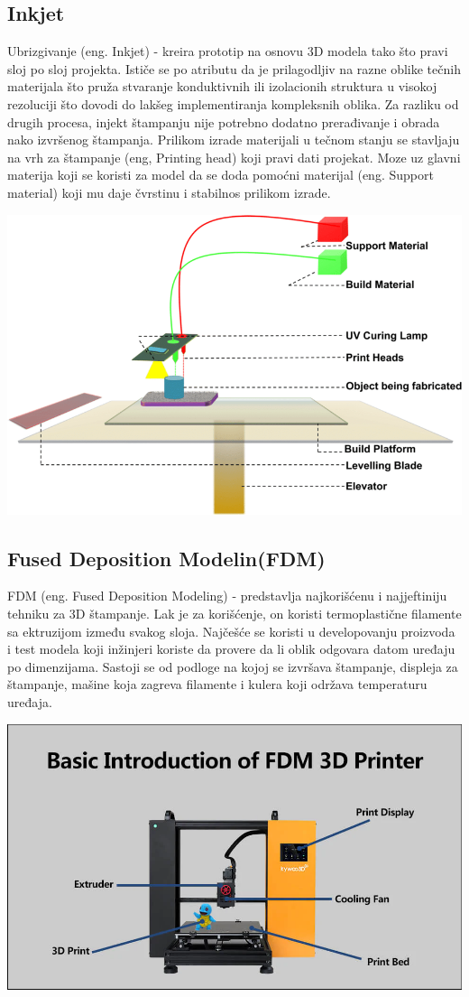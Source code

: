 \documentclass[a4paper]{article}
\begin{document}
{\subsection{Inkjet}
\label{subsec:podnaslov1}
Ubrizgivanje (eng. Inkjet) - kreira prototip na osnovu 3D modela tako što pravi sloj po sloj projekta.
\bigbreak Ističe se po atributu da je prilagodljiv na razne oblike tečnih materijala što pruža stvaranje konduktivnih ili izolacionih struktura u visokoj rezoluciji što dovodi do lakšeg implementiranja kompleksnih oblika. 
\bigbreak Za razliku od drugih procesa, injekt štampanju nije potrebno dodatno prerađivanje i obrada nako izvršenog štampanja.
\bigbreak Prilikom izrade materijali u tečnom stanju se stavljaju na vrh za štampanje (eng, Printing head) koji pravi dati projekat.
\bigbreak Moze uz glavni materija koji se koristi za model da se doda pomoćni materijal (eng. Support material) koji mu daje čvrstinu i stabilnos prilikom izrade.
\begin{center}
\includegraphics[width=.5\textwidth ]{Tehnikeslike/Inject.png}
\end{center}

\subsection{Fused Deposition Modelin(FDM)}
\label{subsec:podnaslov2}
FDM (eng. Fused Deposition Modeling) - predstavlja najkorišćenu i najjeftiniju tehniku za 3D štampanje. Lak je za korišćenje, on koristi termoplastične filamente sa ektruzijom između svakog sloja.
\bigbreak Najčešće se koristi u developovanju proizvoda  i test modela koji inžinjeri koriste da provere da li oblik odgovara datom uređaju po dimenzijama. 
\bigbreak Sastoji se od podloge na kojoj se izvršava štampanje, displeja za štampanje, mašine koja zagreva filamente i kulera koji održava temperaturu uređaja.

\begin{center}
\includegraphics[width=.5\textwidth ]{Tehnikeslike/FDM.PNG}
\end{center}

}
\end{document}
